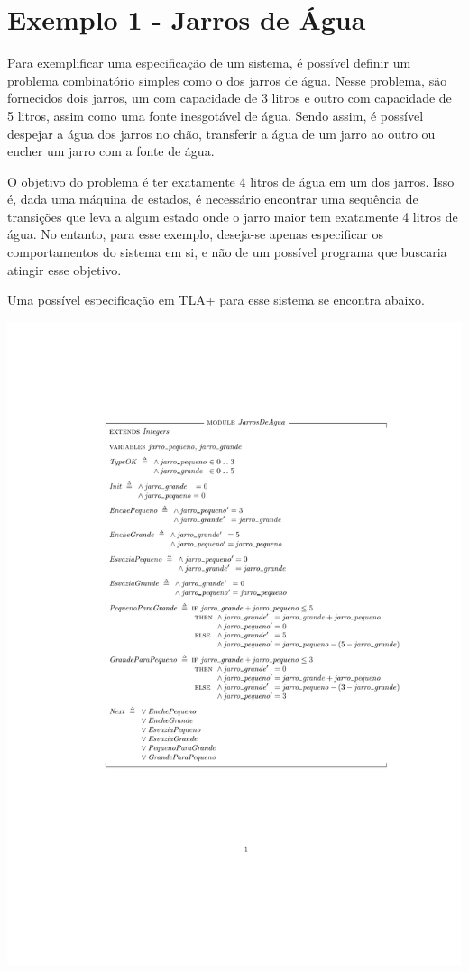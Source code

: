 \section{Exemplo 1 - Jarros de Água}

Para exemplificar uma especificação de um sistema, é possível definir um problema combinatório simples como o dos jarros de água. Nesse problema, são fornecidos dois jarros, um com capacidade de 3 litros e outro com capacidade de 5 litros, assim como uma fonte inesgotável de água. Sendo assim, é possível despejar a água dos jarros no chão, transferir a água de um jarro ao outro ou encher um jarro com a fonte de água.

O objetivo do problema é ter exatamente 4 litros de água em um dos jarros. Isso é, dada uma máquina de estados, é necessário encontrar uma sequência de transições que leva a algum estado onde o jarro maior tem exatamente 4 litros de água. No entanto, para esse exemplo, deseja-se apenas especificar os comportamentos do sistema em si, e não de um possível programa que buscaria atingir esse objetivo.

Uma possível especificação em TLA+ para esse sistema se encontra abaixo.

\hspace*{-2in}
\vspace*{-1in}
\includegraphics{JarrosDeAgua.pdf}

